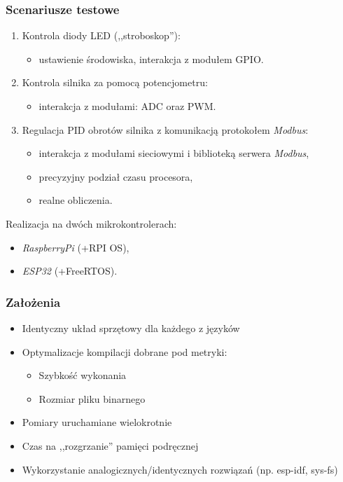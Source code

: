\documentclass{beamer}
\newcommand{\Esp}{\emph{ESP32}}
\newcommand{\Rpi}{\emph{RaspberryPi}}
\newcommand{\Modbus}{\emph{Modbus}}
\begin{document}
\begin{frame}
	\frametitle{Scenariusze testowe}
	\begin{enumerate}
		\item Kontrola diody LED (,,stroboskop''):
		      \begin{itemize}
			      \item ustawienie środowiska, interakcja z modułem GPIO.
		      \end{itemize}
		\item Kontrola silnika za pomocą potencjometru:
		      \begin{itemize}
			      \item interakcja z modułami: ADC oraz PWM.
		      \end{itemize}
		\item Regulacja PID obrotów silnika z komunikacją protokołem \Modbus{}:
		      \begin{itemize}
			      \item interakcja z modułami sieciowymi i biblioteką serwera
			            \Modbus{},
			      \item precyzyjny podział czasu procesora,
			      \item realne obliczenia.
		      \end{itemize}
	\end{enumerate}

	Realizacja na dwóch mikrokontrolerach:
	\begin{multicols}{2}
		\begin{itemize}
			\item \Rpi{} (+RPI OS),
			\item \Esp{} (+FreeRTOS).
		\end{itemize}
	\end{multicols}
\end{frame}

\begin{frame}
	\frametitle{Założenia}
	\begin{itemize}
		\item Identyczny układ sprzętowy dla każdego z języków
		\item Optymalizacje kompilacji dobrane pod metryki:
		      \begin{itemize}
			      \item Szybkość wykonania
			      \item Rozmiar pliku binarnego
		      \end{itemize}
		\item Pomiary uruchamiane wielokrotnie
		\item Czas na ,,rozgrzanie'' pamięci podręcznej
		\item Wykorzystanie analogicznych/identycznych rozwiązań (np. esp-idf,
		      sys-fs)
	\end{itemize}
\end{frame}
\end{document}
